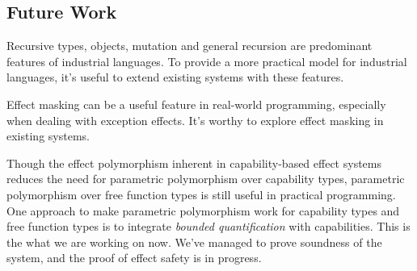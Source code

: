 \subsection{Future Work}

Recursive types, objects, mutation and general recursion are
predominant features of industrial languages. To provide a more
practical model for industrial languages, it's useful to extend
existing systems with these features.

Effect masking can be a useful feature in real-world programming,
especially when dealing with exception effects. It's worthy to explore
effect masking in existing systems.

Though the effect polymorphism inherent in capability-based effect
systems reduces the need for parametric polymorphism over capability
types, parametric polymorphism over free function types is still
useful in practical programming.  One approach to make parametric
polymorphism work for capability types and free function types is to
integrate \emph{bounded quantification} with capabilities. This is the
what we are working on now. We've managed to prove soundness of the
system, and the proof of effect safety is in progress.


